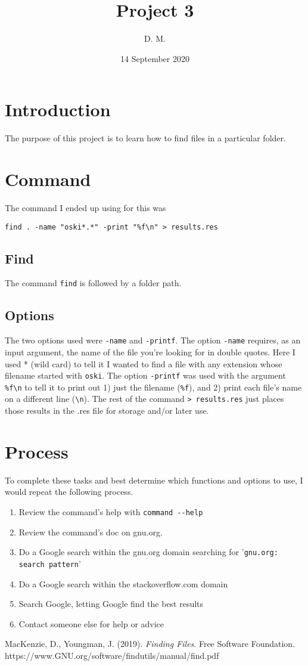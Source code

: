 \documentclass{article}
\begin{document}
\title{Project 3}
\author{D. M.}
\date{14 September 2020}
\maketitle

\section{Introduction}
\label{intro}
The purpose of this project is to learn how to find files in a particular folder.

\section{Command}
\label{sec:1}
The command I ended up using for this was
\begin{verbatim}
find . -name "oski*.*" -print "%f\n" > results.res
\end{verbatim}

\subsection{Find}
\label{sec:2}
The command \verb|find| is followed by a folder path.

\subsection{Options}
\label{sec:3}

The two options used were \verb|-name| and \verb|-printf|. The option
\verb|-name| requires, as an input argument, the name of the file
you're looking for in double quotes. Here I used * (wild card) to tell
it I wanted to find a file with any extension whose filename started with
\verb|oski|. The option \verb|-printf| was used with the argument \verb|%f\n|
to tell it to print out 1) just the filename (\verb|%f|), and 2) print
each file's name on a different line (\verb|\n|). The rest of the command
\verb|> results.res| just places those results in the .res file for storage
and/or later use.

\section{Process}
\label{sec:4}
To complete these tasks and best determine which functions and options to use,
I would repeat the following process.
\begin{enumerate}
	\item Review the command's help with \verb|command --help|
	\item Review the command's doc on gnu.org.
	\item Do a Google search within the gnu.org domain searching for
 '\verb|gnu.org: search pattern|'
	\item Do a Google search within the stackoverflow.com domain
	\item Search Google, letting Google find the best results
	\item Contact someone else for help or advice
\end{enumerate}

\begin{thebibliography}{9}
MacKenzie, D., Youngman, J. (2019). \textit{Finding Files}. Free Software Foundation. 
https://www.GNU.org/software/findutils/manual/find.pdf
\end{thebibliography}
\end{document}

